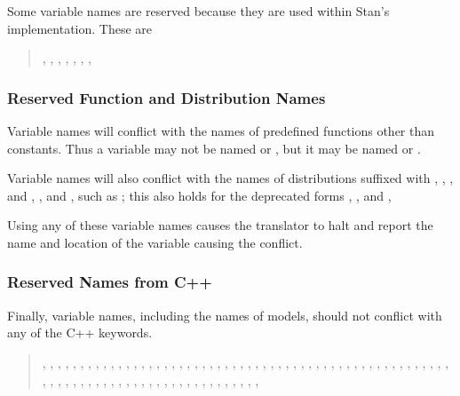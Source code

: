 Some variable names are reserved because they are used within
Stan's \Cpp implementation.  These are
%
\begin{quote}
,
,
,
,
,
,
,
\end{quote}
%

\subsubsection{Reserved Function and Distribution Names}

Variable names will conflict with the names of predefined functions
other than constants.  Thus a variable may not be named 
or , but it may be named  or .

Variable names will also conflict with the names of distributions
suffixed with , , , and
, , and , such as
; this also holds for the deprecated forms
, , and ,

Using any of these variable names causes the  translator
to halt and report the name and location of the variable causing the
conflict.


\subsubsection{Reserved Names from C++}

Finally, variable names, including the names of models, should not
conflict with any of the C++ keywords.
%
\begin{quote}
,
,
,
,
,
,
,
,
,
,
,
,
,
,
,
,
,
,
,
,
,
,
,
,
,
,
,
,
,
,
,
,
,
,
,
,
,
,
,
,
,
,
,
,
,
,
,
,
,
,
,
,
,
,
,
,
,
,
,
,
,
,
,
,
,
,
,
,
,
,
,
,
,
,
,
,
,
,
,
,
,
,
,
\end{quote}

